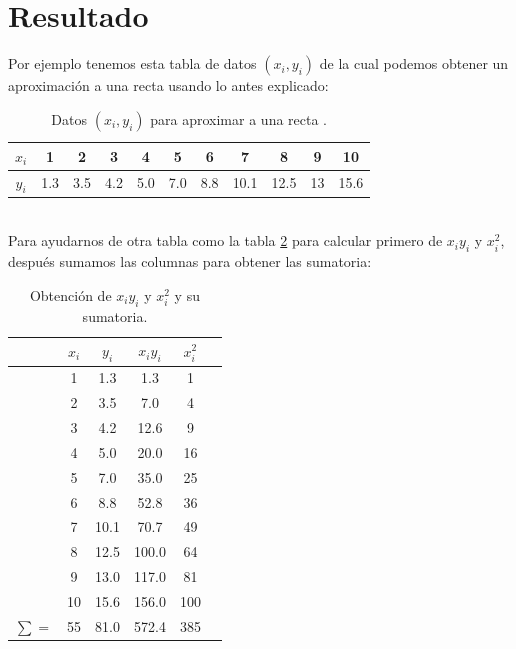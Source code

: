 \documentclass[12pt]{article}
\begin{document}
		\section*{\centering Resultado}\label{sec:Resultado}
			Por ejemplo tenemos esta tabla de datos $ (x_i, y_i) $ de la cual podemos obtener un 
			aproximación a una recta usando lo antes explicado: \\
			\begin{table}[h!]
				\centering
				\begin{tabular}{|c    c    c    c    c    c    c    c    c    c    c|}
					\hline
					$ x_i $ & 1 & 2 & 3 & 4 & 5 & 6 & 7 & 8 & 9 & 10 \\\hline
					$ y_i $ & 1.3 & 3.5 & 4.2 & 5.0 & 7.0 & 8.8 & 10.1 & 12.5 & 13 & 15.6 \\\hline							
				\end{tabular}
				\caption{Datos $ (x_i, y_i) $ para aproximar a una recta .\cite{bib:item3}}
				\label{tab:1}
			\end{table}\\
			Para ayudarnos de otra tabla como la tabla \ref{tab:2} para calcular primero de $ x_iy_i $ y $ x_i^2 $, 
			después sumamos las columnas para obtener las sumatoria: \\
			\begin{table}[h!]
				\centering
				\begin{tabular}{c    c    c    c    c    c}
					\hline
					& $ x_i $ & $ y_i $ & $ x_iy_i $ & $ x_i^2 $ \\\hline
					& 1 & 1.3 & 1.3 & 1 \\							
					& 2 & 3.5 & 7.0 & 4 \\
					& 3 & 4.2 & 12.6 & 9 \\
					& 4 & 5.0 & 20.0 & 16 \\
					& 5 & 7.0 & 35.0 & 25 \\
					& 6 & 8.8 & 52.8 & 36 \\
					& 7 & 10.1 & 70.7 & 49 \\
					& 8 & 12.5 & 100.0 & 64 \\
					& 9 & 13.0 & 117.0 & 81 \\
					& 10 & 15.6 & 156.0 & 100 \\\hline
					$ \sum = $& 55 & 81.0 & 572.4 & 385 \\\hline
				\end{tabular}
				\caption{Obtención de $ x_iy_i $ y $x_i^2 $ y su sumatoria.\cite{bib:item3}}
				\label{tab:2}
			\end{table}\\
\end{document}
